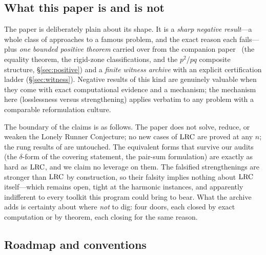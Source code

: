 \subsection{What this paper is and is not}

The paper is deliberately plain about its shape. It is a \emph{sharp
negative result}---a whole class of approaches to a famous problem, and
the exact reason each fails---plus \emph{one bounded positive theorem}
carried over from the companion paper~\cite{companion-monograph} (the equality theorem, the
rigid-zone classifications, and the $p^2$/$pq$ composite structure,
\S\ref{sec:positive}) and a \emph{finite witness archive} with an explicit
certification ladder (\S\ref{sec:witness}). Negative results of this kind
are genuinely valuable when they come with exact computational evidence
and a mechanism; the mechanism here (losslessness versus strengthening)
applies verbatim to any problem with a comparable reformulation culture.

The boundary of the claims is as follows. The paper does not solve,
reduce, or weaken the Lonely Runner Conjecture; no new cases of $\mathrm{LRC}$
are proved at any $n$; the rung results of
\cite{Rosenfeld8,Trakulthongchai,Sungkawichai,Allikvere} are untouched.
The equivalent forms that survive our audits (the $\delta$-form of the
covering statement, the pair-sum formulation) are exactly as hard as
$\mathrm{LRC}$, and we claim no leverage on them. The falsified strengthenings
are stronger than $\mathrm{LRC}$ by construction, so their falsity implies
nothing about $\mathrm{LRC}$ itself---which remains open, tight at the harmonic
instances, and apparently indifferent to every toolkit this program could
bring to bear. What the archive adds is certainty about where \emph{not}
to dig: four doors, each closed by exact computation or by theorem, each
closing for the same reason.

\subsection{Roadmap and conventions}

